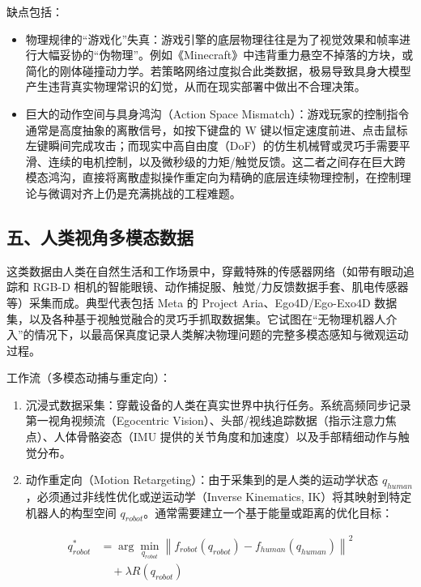 缺点包括：

\begin{itemize}
\tightlist
\item
  物理规律的``游戏化''失真：游戏引擎的底层物理往往是为了视觉效果和帧率进行大幅妥协的``伪物理''。例如《Minecraft》中违背重力悬空不掉落的方块，或简化的刚体碰撞动力学。若策略网络过度拟合此类数据，极易导致具身大模型产生违背真实物理常识的幻觉，从而在现实部署中做出不合理决策。
\item
  巨大的动作空间与具身鸿沟（Action Space Mismatch）：游戏玩家的控制指令通常是高度抽象的离散信号，如按下键盘的 W 键以恒定速度前进、点击鼠标左键瞬间完成攻击；而现实中高自由度（DoF）的仿生机械臂或灵巧手需要平滑、连续的电机控制，以及微秒级的力矩/触觉反馈。这二者之间存在巨大跨模态鸿沟，直接将离散虚拟操作重定向为精确的底层连续物理控制，在控制理论与微调对齐上仍是充满挑战的工程难题。
\end{itemize}

\hypertarget{ux4e94ux4ebaux7c7bux89c6ux89d2ux591aux6a21ux6001ux6570ux636e}{%
\subsection{五、人类视角多模态数据}\label{ux4e94ux4ebaux7c7bux89c6ux89d2ux591aux6a21ux6001ux6570ux636e}}

这类数据由人类在自然生活和工作场景中，穿戴特殊的传感器网络（如带有眼动追踪和 RGB-D 相机的智能眼镜、动作捕捉服、触觉/力反馈数据手套、肌电传感器等）采集而成。典型代表包括 Meta 的 Project Aria、Ego4D/Ego-Exo4D 数据集，以及各种基于视触觉融合的灵巧手抓取数据集。它试图在``无物理机器人介入''的情况下，以最高保真度记录人类解决物理问题的完整多模态感知与微观运动过程。

工作流（多模态动捕与重定向）：

\begin{enumerate}
\def\labelenumi{\arabic{enumi}.}
\tightlist
\item
  沉浸式数据采集：穿戴设备的人类在真实世界中执行任务。系统高频同步记录第一视角视频流（Egocentric Vision）、头部/视线追踪数据（指示注意力焦点）、人体骨骼姿态（IMU 提供的关节角度和加速度）以及手部精细动作与触觉分布。
\item
  动作重定向（Motion Retargeting）：由于采集到的是人类的运动学状态 \(q_{human}\)，必须通过非线性优化或逆运动学（Inverse Kinematics, IK）将其映射到特定机器人的构型空间 \(q_{robot}\)。通常需要建立一个基于能量或距离的优化目标：
\end{enumerate}

\[
\begin{aligned}
q_{robot}^{*}
&=
\arg\min_{q_{robot}}
\left\|
f_{robot}(q_{robot})-f_{human}(q_{human})
\right\|^2
\\
&\quad+
\lambda R(q_{robot})
\end{aligned}
\]

